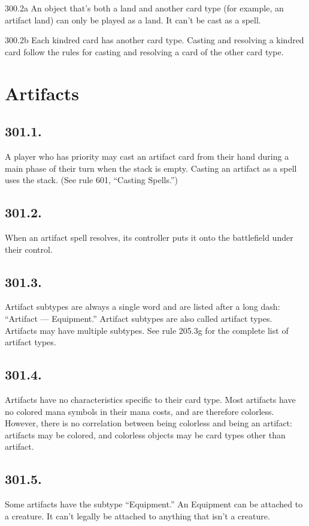 300.2a An object that’s both a land and another card type (for example, an artifact land) can only be played as a land. It can’t be cast as a spell.

300.2b Each kindred card has another card type. Casting and resolving a kindred card follow the rules for casting and resolving a card of the other card type.


\section{Artifacts}
\subsection*{301.1.}
A player who has priority may cast an artifact card from their hand during a main phase of their turn when the stack is empty. Casting an artifact as a spell uses the stack. (See rule 601, “Casting Spells.”)

\subsection*{301.2.}
When an artifact spell resolves, its controller puts it onto the battlefield under their control.

\subsection*{301.3.}
Artifact subtypes are always a single word and are listed after a long dash: “Artifact — Equipment.” Artifact subtypes are also called artifact types. Artifacts may have multiple subtypes. See rule 205.3g for the complete list of artifact types.

\subsection*{301.4.}
Artifacts have no characteristics specific to their card type. Most artifacts have no colored mana symbols in their mana costs, and are therefore colorless. However, there is no correlation between being colorless and being an artifact: artifacts may be colored, and colorless objects may be card types other than artifact.

\subsection*{301.5.}
Some artifacts have the subtype “Equipment.” An Equipment can be attached to a creature. It can’t legally be attached to anything that isn’t a creature.

